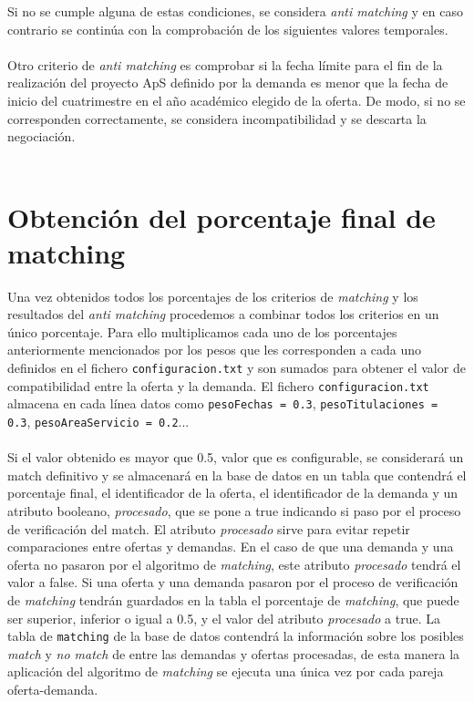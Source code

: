 \documentclass[11pt]{book}
\begin{document}
 Si no se cumple alguna de estas condiciones, se considera \emph{anti matching} y en caso contrario se continúa con la comprobación de los siguientes valores temporales.\\\\
Otro criterio de \emph{anti matching} es comprobar si la fecha límite para el fin de la realización del proyecto ApS definido por la demanda es menor que la fecha de inicio del cuatrimestre en el año académico elegido de la oferta. De modo, si no se corresponden correctamente, se considera incompatibilidad y se descarta la negociación.\\\\
\section{Obtención del porcentaje final de matching}
Una vez obtenidos todos los porcentajes de los criterios de \emph{matching} y los resultados del \emph{anti matching} procedemos a combinar todos los criterios en un único porcentaje. Para ello multiplicamos cada uno de los porcentajes anteriormente mencionados por los pesos que les corresponden a cada uno definidos en el fichero \texttt{configuracion.txt} y son sumados para obtener el valor de compatibilidad entre la oferta y la demanda. El fichero \texttt{configuracion.txt} almacena en cada línea datos como \texttt{pesoFechas = 0.3}, \texttt{pesoTitulaciones = 0.3}, \texttt{pesoAreaServicio = 0.2}...  \\\\
Si el valor obtenido es mayor que 0.5, valor que es configurable, se considerará un match definitivo y se almacenará en la base de datos en un tabla que contendrá el porcentaje final, el identificador de la oferta, el identificador de la demanda y un atributo booleano, \emph{procesado}, que se pone a true indicando si paso por el proceso de verificación del match. 
El atributo \emph{procesado} sirve para evitar repetir comparaciones entre ofertas y demandas. En el caso de que una demanda y una oferta no pasaron por el algoritmo de \emph{matching}, este atributo \emph{procesado} tendrá el valor a false. Si una oferta y una demanda pasaron por el proceso de verificación de \emph{matching} tendrán guardados en la tabla el porcentaje de \emph{matching}, que puede ser superior, inferior o igual a 0.5, y el valor del atributo \emph{procesado} a true. La tabla de \texttt{matching} de la base de datos contendrá la información sobre los posibles \emph{match} y \emph{no match} de entre las demandas y ofertas procesadas, de esta manera la aplicación del algoritmo de \emph{matching} se ejecuta una única vez por cada pareja oferta-demanda. \\\\
\end{document}

